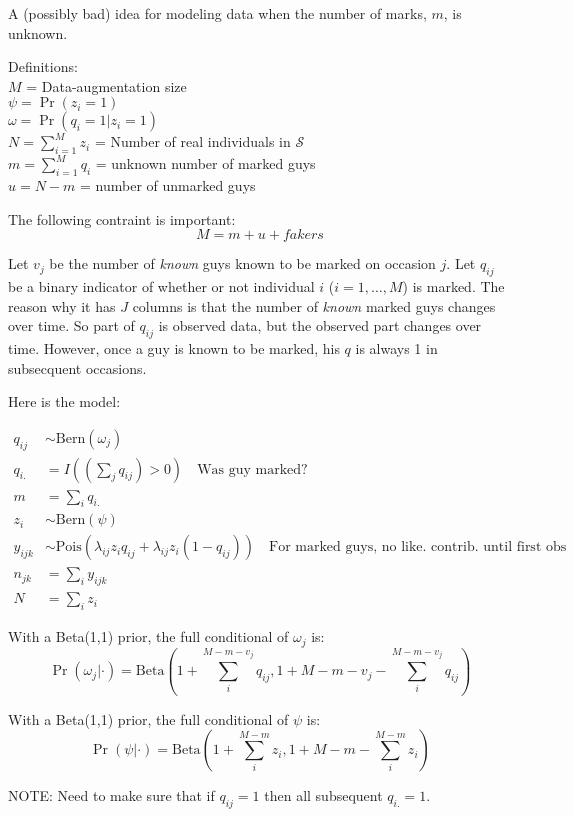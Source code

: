 \documentclass[12pt]{article}
\begin{document}
A (possibly bad) idea for modeling data when the number of marks, $m$, is
unknown. %

\vspace{1cm}

Definitions: \\
$M$ = Data-augmentation size \\
$\psi = \Pr(z_i=1)$ \\ %
$\omega = \Pr(q_i=1|z_i=1)$ \\
$N = \sum_{i=1}^M z_i$ = Number of real individuals in $\mathcal{S}$ \\
$m = \sum_{i=1}^M q_i$ = unknown number of marked guys \\
$u = N - m$ = number of unmarked guys

\vspace{1cm}

The following contraint is important:
\[
M = m + u + fakers
\]


\newpage

Let $v_j$ be the number of \textit{known} guys known to be marked on
occasion $j$. Let $q_{ij}$ be a binary indicator of whether or not individual $i$
($i=1,\ldots,M$) is marked. The reason why it has $J$ columns is that
the number of \textit{known} marked guys changes over time. So part of
$q_{ij}$ is observed data, but the observed part changes over time.
However, once a
guy is known to be marked, his $q$ is always 1 in subsecquent occasions.

Here is the model:

\begin{align*}
q_{ij} &\sim \text{Bern}(\omega_j) \\
q_{i.} &= I((\sum_j q_{ij})>0) \quad \text{Was guy marked?}\\
m &= \sum_i q_{i.} \\
z_i &\sim \text{Bern}(\psi) \\
y_{ijk} &\sim
\text{Pois}(\lambda_{ij}z_{i}q_{ij} + \lambda_{ij}z_i(1-q_{ij})) \quad
\text{For marked guys, no like. contrib. until first obs}\\
n_{jk} &= \sum_i y_{ijk} \\
N &= \sum_i z_i
\end{align*}

With a Beta(1,1) prior, the full conditional of $\omega_j$ is:
\[
\Pr(\omega_j|\cdot) = \text{Beta}(1+\sum_i^{M-m-v_j} q_{ij}, 1+M-m-v_j-\sum_i^{M-m-v_j}q_{ij})
\]

With a Beta(1,1) prior, the full conditional of $\psi$ is:
\[
\Pr(\psi|\cdot) = \text{Beta}(1+\sum_i^{M-m} z_{i}, 1+M-m-\sum_i^{M-m}z_i)
\]

NOTE: Need to make sure that if $q_{ij}=1$ then all subsequent
$q_{i.}=1$.
\end{document}
